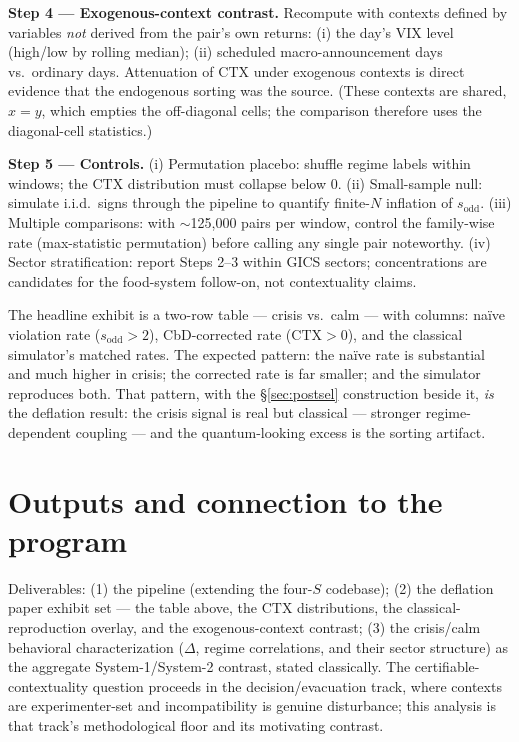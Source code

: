 \documentclass[11pt]{article}
\newcommand{\sodd}{s_{\mathrm{odd}}}
\begin{document}
\textbf{Step 4 --- Exogenous-context contrast.} Recompute with contexts defined by variables
\emph{not} derived from the pair's own returns: (i) the day's VIX level (high/low by rolling
median); (ii) scheduled macro-announcement days vs.\ ordinary days. Attenuation of
$\mathrm{CTX}$ under exogenous contexts is direct evidence that the endogenous sorting was the
source. (These contexts are shared, $x=y$, which empties the off-diagonal cells; the
comparison therefore uses the diagonal-cell statistics.)

\textbf{Step 5 --- Controls.} (i) Permutation placebo: shuffle regime labels within windows;
the $\mathrm{CTX}$ distribution must collapse below 0. (ii) Small-sample null: simulate
i.i.d.\ signs through the pipeline to quantify finite-$N$ inflation of $\sodd$.
(iii) Multiple comparisons: with $\sim$125{,}000 pairs per window, control the family-wise
rate (max-statistic permutation) before calling any single pair noteworthy.
(iv) Sector stratification: report Steps 2--3 within GICS sectors; concentrations are
candidates for the food-system follow-on, not contextuality claims.

\begin{intuition}
The headline exhibit is a two-row table --- crisis vs.\ calm --- with columns: na\"ive
violation rate ($\sodd>2$), CbD-corrected rate ($\mathrm{CTX}>0$), and the classical
simulator's matched rates. The expected pattern: the na\"ive rate is substantial and much
higher in crisis; the corrected rate is far smaller; and the simulator reproduces both. That
pattern, with the \S\ref{sec:postsel} construction beside it, \emph{is} the deflation result:
the crisis signal is real but classical --- stronger regime-dependent coupling --- and the
quantum-looking excess is the sorting artifact.
\end{intuition}

\section{Outputs and connection to the program}

Deliverables: (1) the pipeline (extending the four-$S$ codebase); (2) the deflation paper
exhibit set --- the table above, the $\mathrm{CTX}$ distributions, the classical-reproduction
overlay, and the exogenous-context contrast; (3) the crisis/calm behavioral characterization
($\Delta$, regime correlations, and their sector structure) as the aggregate
System-1/System-2 contrast, stated classically. The certifiable-contextuality question
proceeds in the decision/evacuation track, where contexts are experimenter-set and
incompatibility is genuine disturbance; this analysis is that track's methodological floor
and its motivating contrast.
\end{document}
